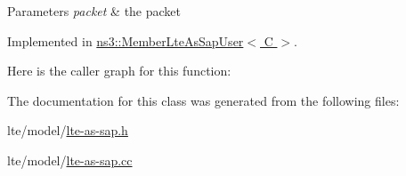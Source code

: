 \begin{DoxyParams}{Parameters}
{\em packet} & the packet \\
\hline
\end{DoxyParams}


Implemented in \hyperlink{classns3_1_1MemberLteAsSapUser_ad62ce6b2ea868759c374632747d6b441}{ns3\+::\+Member\+Lte\+As\+Sap\+User$<$ C $>$}.



Here is the caller graph for this function\+:




The documentation for this class was generated from the following files\+:\begin{DoxyCompactItemize}
\item 
lte/model/\hyperlink{lte-as-sap_8h}{lte-\/as-\/sap.\+h}\item 
lte/model/\hyperlink{lte-as-sap_8cc}{lte-\/as-\/sap.\+cc}\end{DoxyCompactItemize}
